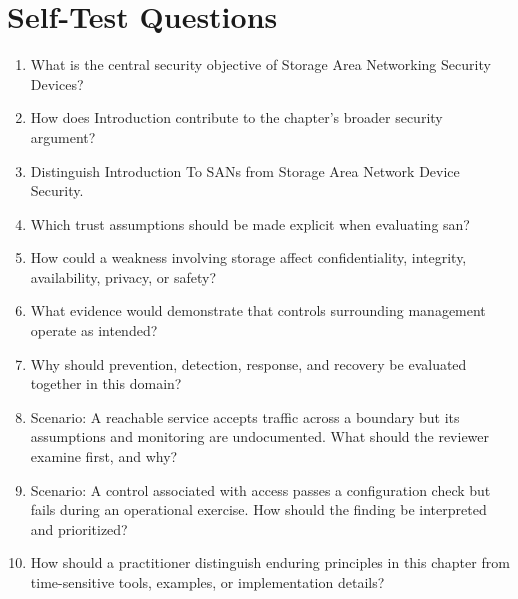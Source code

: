 \documentclass[11pt]{article}
\begin{document}
\section*{Self-Test Questions}
\begin{enumerate}
\item What is the central security objective of Storage Area Networking Security Devices?
\item How does Introduction contribute to the chapter's broader security argument?
\item Distinguish Introduction To SANs from Storage Area Network Device Security.
\item Which trust assumptions should be made explicit when evaluating san?
\item How could a weakness involving storage affect confidentiality, integrity, availability, privacy, or safety?
\item What evidence would demonstrate that controls surrounding management operate as intended?
\item Why should prevention, detection, response, and recovery be evaluated together in this domain?
\item Scenario: A reachable service accepts traffic across a boundary but its assumptions and monitoring are undocumented. What should the reviewer examine first, and why?
\item Scenario: A control associated with access passes a configuration check but fails during an operational exercise. How should the finding be interpreted and prioritized?
\item How should a practitioner distinguish enduring principles in this chapter from time-sensitive tools, examples, or implementation details?
\end{enumerate}
\end{document}
